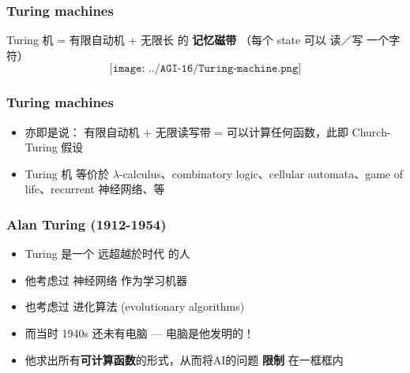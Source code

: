 \documentclass[17pt]{beamer}
\begin{document}
\begin{frame}
\frametitle{Turing machines}
	Turing 机 = 有限自动机 + 无限长 的 {\color{red}\textbf{记忆磁带}} （每个 state 可以 读／写 一个字符）\\
	\begin{equation}
	\label{fig:Turing-machine}
	\texttt{[image: ../AGI-16/Turing-machine.png]}
	\end{equation}
\end{frame}

\begin{frame}
\frametitle{Turing machines}
\begin{itemize}
	\item 亦即是说： 有限自动机 + 无限读写带 = 可以计算任何函数，此即 Church-Turing 假设
	\item Turing 机 等价於 $\lambda$-calculus、combinatory logic、cellular automata、game of life、recurrent 神经网络、等
\end{itemize}
\end{frame}

\begin{frame}
\frametitle{Alan Turing (1912-1954)}
\begin{itemize}
	\item Turing 是一个 远超越於时代 的人
	\item 他考虑过 神经网络 作为学习机器
	\item 也考虑过 进化算法 (evolutionary algorithms)
	\item 而当时 1940s 还未有电脑 --- 电脑是他发明的！
	\item {\color{red}他求出所有\textbf{可计算函数}的形式，从而将AI的问题 \textbf{限制} 在一框框内} 
\end{itemize}
\end{frame}
\end{document}

